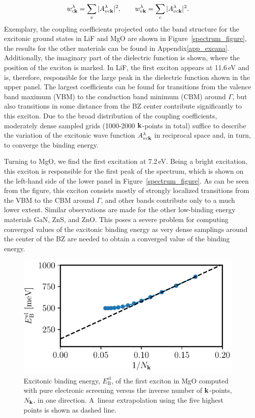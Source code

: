 %
\begin{equation}
    w^\lambda_{c\mathbf{k}} = \sum_v |A^\lambda_{vc\mathbf{k}}|^2, \qquad w^\lambda_{v\mathbf{k}} = \sum_c |A^\lambda_{vc\mathbf{k}}|^2.
\end{equation}
%
Exemplary, the coupling coefficients projected onto the band structure for the excitonic ground states in LiF and MgO are shown in Figure~\ref{spectrum_figure}, the results for the other materials can be found in Appendix\;\ref{app_excana}.  Additionally, the imaginary part of the dielectric function is shown, where the position of the exciton is marked. In LiF, the first exciton appears at 11.6\,eV and is, therefore, responsible for the large peak in the dielectric function shown in the upper panel. The largest coefficients can be found for transitions from the  valence band maximum (VBM) to the conduction band minimum (CBM) around $\Gamma$, but also transitions in some distance from the BZ center contribute significantly to this exciton. Due to the broad distribution of the coupling coefficients, moderately dense sampled grids (1000-2000 $\k$-points in total) suffice to describe the variation of the excitonic wave function $A^\lambda_{vc\mathbf{k}}$ in reciprocal space and, in turn, to converge the binding energy.\par
Turning to MgO, we find the first excitation at 7.2\,eV. Being a bright excitation, this exciton is responsible for the first peak of the spectrum, which is shown on the left-hand side of the lower panel in Figure~\ref{spectrum_figure}.  As can be seen from the figure, this exciton consists mostly of strongly localized transitions from the VBM to the CBM around $\Gamma$, and other bands contribute only to a much lower extent. Similar observations are made for the other low-binding energy materials GaN, ZnS, and ZnO. This poses a severe problem for computing converged values of the excitonic binding energy as very dense samplings around the center of the BZ are needed to obtain a converged value of the binding energy.\par
%
\begin{figure}[t]
\captionsetup{format=plain}
\centering
\includegraphics{work/plots/mgo_conv.pdf}
\caption[Excitonic binding energy, $E^\text{el}_\text{B}$, in MgO versus the inverse number of $\k$-points.]{Excitonic binding energy, $E^\text{el}_\text{B}$, of the first exciton in MgO computed with pure electronic screening versus the inverse number of $\k$-points, $N_{\mathbf{k}}$, in one direction. A~linear extrapolation using the five highest points is shown as dashed line. \label{conv_mgo}}
\end{figure}
